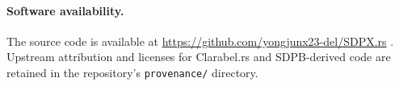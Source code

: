 \documentclass[11pt]{article}
\newcommand{\code}[1]{\texttt{#1}}
\begin{document}
\paragraph{Software availability.}
The source code is available at
\url{https://github.com/yongjunx23-del/SDPX.rs} \cite{SDPXrs}. Upstream
attribution and licenses for Clarabel.rs and SDPB-derived code are retained in
the repository's \code{provenance/} directory.



\end{document}
